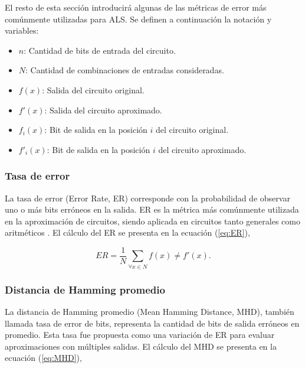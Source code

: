 El resto de esta sección introducirá algunas de las métricas de error más
comúnmente utilizadas para ALS. Se definen a continuación la notación y variables:

\begin{itemize}
  \item $n$: Cantidad de bits de entrada del circuito.
  \item $N$: Cantidad de combinaciones de entradas consideradas.
  \item $f(x)$: Salida del circuito original.
  \item $f'(x)$: Salida del circuito aproximado.
  \item $f_i(x)$: Bit de salida en la posición $i$ del circuito original.
  \item $f'_i(x)$: Bit de salida en la posición $i$ del circuito aproximado.
\end{itemize}

\subsubsection{Tasa de error}

La tasa de error (Error Rate, ER) corresponde con la probabilidad de observar
uno o más bits erróneos en la salida. ER es la métrica más comúnmente utilizada
en la aproximación de circuitos, siendo aplicada en circuitos tanto generales
como aritméticos \cite{ammes_two-level_2022}. El cálculo del ER se presenta en
la ecuación (\ref{eq:ER}),

\begin{equation} \label{eq:ER}
  ER = \frac{1}{N} \sum_{\forall x \in N} f(x) \neq f'(x).
\end{equation}

\subsubsection{Distancia de Hamming promedio}

La distancia de Hamming promedio (Mean Hamming Distance, MHD), también llamada
tasa de error de bits, representa la cantidad de bits de salida erróneos en
promedio. Esta tasa fue propuesta como una variación de ER para evaluar
aproximaciones con múltiples salidas. El cálculo del MHD se presenta en la
ecuación (\ref{eq:MHD}),

